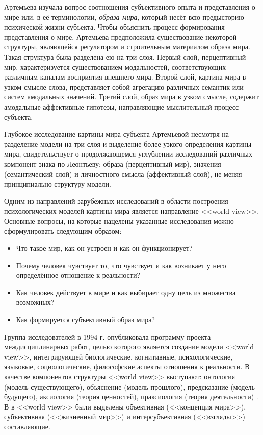 Артемьева изучала вопрос соотношения субъективного опыта и представления о мире или, в её терминологии, \textit{образа мира}, который несёт всю предысторию психической жизни субъекта. Чтобы объяснить процесс формирования представления о мире, Артемьева предположила существование некоторой структуры, являющейся регулятором и строительным материалом образа мира. Такая структура была разделена ею на три слоя. Первый слой, перцептивный мир, характеризуется существованием модальностей, соответствующих различным каналам восприятия внешнего мира. Второй слой, картина мира в узком смысле слова, представляет собой агрегацию различных семантик или систем амодальных значений. Третий слой, образ мира в узком смысле, содержит амодальные аффективные гипотезы, направляющие мыслительный процесс субъекта.

Глубокое исследование картины мира субъекта Артемьевой несмотря на разделение модели на три слоя и выделение более узкого определения картины мира, свидетельствует о продолжающемся углублении исследований различных компонент знака по Леонтьеву: образа (перцептивный мир), значения (семантический слой) и личностного смысла (аффективный слой), не меняя принципиально структуру модели.

Одним из направлений зарубежных исследований в области построения психологических моделей картины мира является направление <<world view>>. Основные вопросы, на которые нацелены указанные исследования можно сформулировать следующим образом: 
\begin{itemize}
	\item Что такое мир, как он устроен и как он функционирует? 
	\item Почему человек чувствует то, что чувствует и как возникает у него определённое отношение к реальности? 
	\item Как человек действует в мире и как выбирает одну цель из множества возможных? 
	\item Как формируется субъективный образ мира?
\end{itemize}
 
Группа исследователей \cite{Aerts1994} в 1994 г. опубликовала программу проекта междисциплинарных работ, целью которого является создание модели <<world view>>, интегрирующей биологические, когнитивные, психологические, языковые, социологические, философские аспекты отношения к реальности. В качестве компонентов структуры <<world view>> выступают: онтология (модель существующего), объяснение (модель прошлого), предсказание (модель будущего), аксиология (теория ценностей), праксиология (теория деятельности) \cite{Aerts1994}. В \cite{Vidal2012} в <<world view>> были выделены объективная (<<концепция мира>>), субъективная (<<жизненный мир>>) и интерсубъективная (<<взгляды>>) составляющие. 

